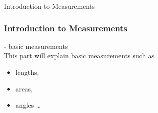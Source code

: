 \begin{omgroup}{Introduction to Measurements}
\begin{module}[id=intromeasurements]
\begin{frame}
  \frametitle{Introduction to Measurements}
  - basic measurements\\
  This part will explain basic measurements such as
  \begin{itemize}
    \item lengths,
    \item areas,
    \item angles \ldots
  \end{itemize}
\end{frame}
\end{module}
\end{omgroup}
